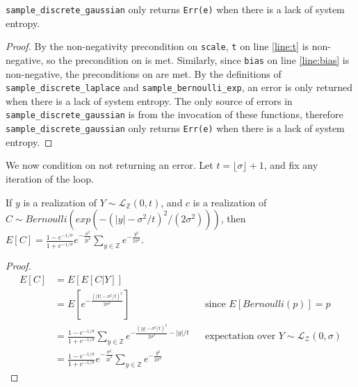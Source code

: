 \documentclass{article}
\begin{document}
 
\begin{lemma} 
    \label{err-e} 
    \texttt{sample\_discrete\_gaussian} only returns \texttt{Err(e)} when there is a lack of system entropy. 
\end{lemma} 
 
\begin{proof} 
    By the non-negativity precondition on \texttt{scale}, \texttt{t} on line \ref{line:t} is non-negative,  
    so the precondition on  is met. 
    Similarly, since \texttt{bias} on line \ref{line:bias} is non-negative, the preconditions on  are met. 
    By the definitions of \texttt{sample\_discrete\_laplace} and \texttt{sample\_bernoulli\_exp}, an error is only returned when there is a lack of system entropy. 
    The only source of errors in \texttt{sample\_discrete\_gaussian} is from the invocation of these functions, 
    therefore \texttt{sample\_discrete\_gaussian} only returns \texttt{Err(e)} when there is a lack of system entropy. 
\end{proof} 
 
We now condition on not returning an error. 
Let $t = \lfloor \sigma \rfloor + 1$, and fix any iteration of the loop.  
 
\begin{lemma}\cite{CKS20} 
    \label{E_C} 
    If $y$ is a realization of $Y \sim \mathcal{L}_\mathbb{Z}(0, t)$, and $c$ is a realization of $C \sim Bernoulli(exp(-(|y| - \sigma^2 / t)^2 / (2 \sigma^2)))$, then 
    $E[C] = \frac{1 - e^{-1/\sigma}}{1 + e^{-1/\sigma}}e^{-\frac{\sigma^2}{2t^2}} \sum_{y\in \mathbb{Z}} e^{-\frac{y^2}{2\sigma^2}}$. 
\end{lemma} 
 
\begin{proof} 
    \begin{align*} 
        E[C] &= E[E[C|Y]] \\ 
        &= E[e^{-\frac{(|Y| - \sigma^2/t)^2}{2\sigma^2}}] && \text{since } E[Bernoulli(p)] = p \\ 
        &= \frac{1 - e^{-1/\sigma}}{1 + e^{-1/\sigma}} \sum_{y\in \mathbb{Z}} e^{-\frac{(|y| - \sigma^2/t)^2}{2\sigma^2} - |y|/t} && \text{expectation over } Y \sim \mathcal{L}_\mathcal{Z}(0, \sigma) \\ 
        &= \frac{1 - e^{-1/\sigma}}{1 + e^{-1/\sigma}}e^{-\frac{\sigma^2}{2t^2}} \sum_{y\in \mathbb{Z}} e^{-\frac{y^2}{2\sigma^2}} 
    \end{align*} 
\end{proof} 
 
\end{document}
